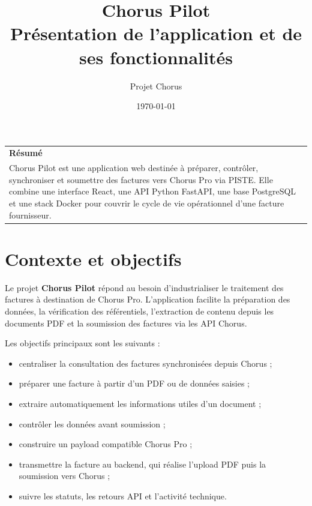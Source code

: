 \documentclass[11pt,a4paper]{article}
\title{
  \vspace{-1.5cm}
  \textbf{\Huge Chorus Pilot}\\
  \vspace{0.3cm}
  \Large Présentation de l'application et de ses fonctionnalités
}
\author{Projet Chorus}
\date{\today}
\begin{document}
\maketitle
\thispagestyle{empty}

\begin{center}
  \vspace{0.5cm}
  \begin{tabularx}{0.9\textwidth}{|X|}
    \hline
    \textbf{Résumé} \\
    Chorus Pilot est une application web destinée à préparer, contrôler,
    synchroniser et soumettre des factures vers Chorus Pro via PISTE. Elle combine
    une interface React, une API Python FastAPI, une base PostgreSQL et une stack
    Docker pour couvrir le cycle de vie opérationnel d'une facture fournisseur. \\
    \hline
  \end{tabularx}
\end{center}

\newpage
\tableofcontents
\newpage

\section{Contexte et objectifs}

Le projet \textbf{Chorus Pilot} répond au besoin d'industrialiser le
traitement des factures à destination de Chorus Pro. L'application facilite la
préparation des données, la vérification des référentiels, l'extraction de
contenu depuis les documents PDF et la soumission des factures via les API
Chorus.

Les objectifs principaux sont les suivants :

\begin{itemize}
  \item centraliser la consultation des factures synchronisées depuis Chorus ;
  \item préparer une facture à partir d'un PDF ou de données saisies ;
  \item extraire automatiquement les informations utiles d'un document ;
  \item contrôler les données avant soumission ;
  \item construire un payload compatible Chorus Pro ;
  \item transmettre la facture au backend, qui réalise l'upload PDF puis la
        soumission vers Chorus ;
  \item suivre les statuts, les retours API et l'activité technique.
\end{itemize}
\end{document}
